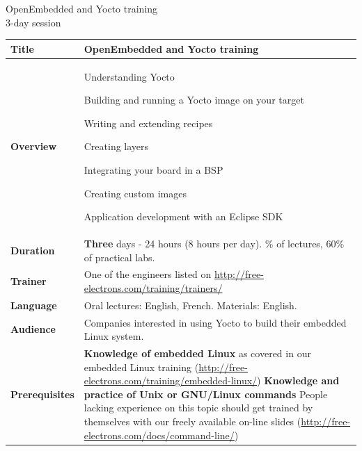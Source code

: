 \documentclass[a4paper,12pt,obeyspaces,spaces,hyphens]{article}
\begin{document}
\thispagestyle{fancy}

\setlength{\arrayrulewidth}{0.8pt}

\begin{center}
\LARGE
OpenEmbedded and Yocto training\\
\large
3-day session
\end{center}
\vspace{1cm}

\small
{}

 {
  \begin{tabularx}{\textwidth}{|g|h|}
    {\bf Title} & OpenEmbedded and Yocto training \\
    \hline

    {\bf Overview} &
    Understanding Yocto \par
    Building and running a Yocto image on your target \par
    Writing and extending recipes \par
    Creating layers \par
    Integrating your board in a BSP \par
    Creating custom images \par
    Application development with an Eclipse SDK \\
    \hline

    {\bf Duration} & {\bf Three} days - 24 hours (8 hours per day).
    \% of lectures, 60\% of practical labs. \\
    \hline

    {\bf Trainer} & One of the engineers listed on
    \newline \url{http://free-electrons.com/training/trainers/}\\
    \hline

    {\bf Language} & Oral lectures: English, French.
    \newline Materials: English.\\
    \hline

    {\bf Audience} & Companies interested in using Yocto to build their
    embedded Linux system.\\
    \hline

    {\bf Prerequisites} & {\bf Knowledge of embedded Linux} as covered
    in our embedded Linux training
    (\url{http://free-electrons.com/training/embedded-linux/}) \newline 
    {\bf Knowledge and practice of Unix or GNU/Linux commands}
    \newline People lacking experience on this topic should get
    trained by themselves with our freely available on-line slides
    (\url{http://free-electrons.com/docs/command-line/}) \\
    \hline


\end{tabularx}}
\end{document}
